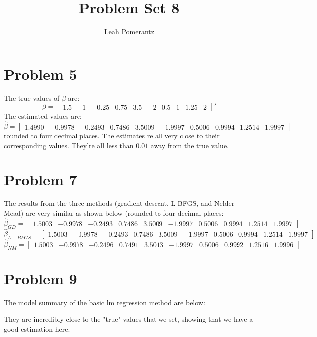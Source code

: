 \documentclass{article}
\title{Problem Set 8}
\author{Leah Pomerantz}
\begin{document}
\maketitle


\section{Problem 5}

The true values of $\beta$ are: $$\beta = \begin{bmatrix}  1.5 & -1 & -0.25 & 0.75 & 3.5 & -2 & 0.5 & 1 & 1.25 & 2 \end{bmatrix}'$$
The estimated values are: $$\hat{\beta} = \begin{bmatrix} 1.4990 & -0.9978 & -0.2493 & 0.7486 & 3.5009 & -1.9997 & 0.5006 & 0.9994 & 1.2514 & 1.9997 \end{bmatrix}$$
rounded to four decimal places. The estimates re all very close to their corresponding values. They're all less than $0.01$ away from the true value.

\section{Problem 7}

The results from the three methods (gradient descent, L-BFGS, and Nelder-Mead) are very similar as shown below (rounded to four decimal places:
$$ \hat{\beta}_{GD} = 
\begin{bmatrix}
    1.5003 & -0.9978 & -0.2493  & 0.7486  & 3.5009 & -1.9997  & 0.5006  & 0.9994  & 1.2514  & 1.9997
\end{bmatrix}
$$
$$ \hat{\beta}_{L-BFGS} = 
\begin{bmatrix}
    1.5003 & -0.9978 & -0.2493 &  0.7486  & 3.5009 & -1.9997  & 0.5006 &  0.9994  & 1.2514  & 1.9997
\end{bmatrix}
$$
$$ \hat{\beta}_{NM} = 
\begin{bmatrix}
    1.5003 & -0.9978 & -0.2496  & 0.7491  & 3.5013 & -1.9997  & 0.5006  & 0.9992  & 1.2516  & 1.9996
\end{bmatrix}
$$


\section{Problem 9}

The model summary of the basic lm regression method are below:

They are incredibly close to the "true" values that we set, showing that we have a good estimation here.
\end{document}
